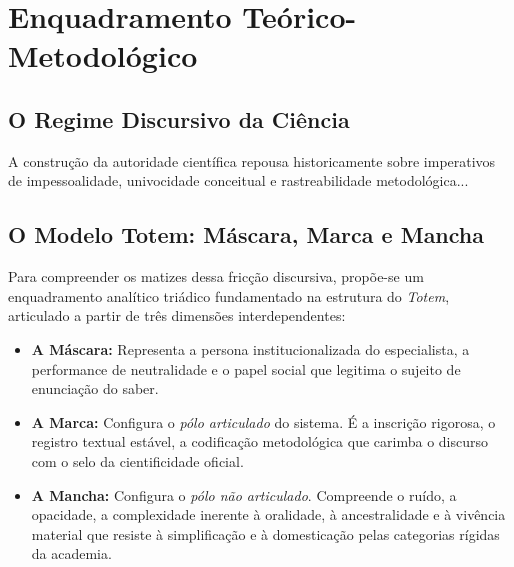 \chapter{Enquadramento Teórico-Metodológico}
\label{cap:referencial}

\section{O Regime Discursivo da Ciência}
A construção da autoridade científica repousa historicamente sobre imperativos de impessoalidade, univocidade conceitual e rastreabilidade metodológica...

\section{O Modelo Totem: Máscara, Marca e Mancha}
Para compreender os matizes dessa fricção discursiva, propõe-se um enquadramento analítico triádico fundamentado na estrutura do \textit{Totem}, articulado a partir de três dimensões interdependentes:

\begin{itemize}
    \item \textbf{A Máscara:} Representa a persona institucionalizada do especialista, a performance de neutralidade e o papel social que legitima o sujeito de enunciação do saber.
    \item \textbf{A Marca:} Configura o \textit{pólo articulado} do sistema. É a inscrição rigorosa, o registro textual estável, a codificação metodológica que carimba o discurso com o selo da cientificidade oficial.
    \item \textbf{A Mancha:} Configura o \textit{pólo não articulado}. Compreende o ruído, a opacidade, a complexidade inerente à oralidade, à ancestralidade e à vivência material que resiste à simplificação e à domesticação pelas categorias rígidas da academia.
\end{itemize}